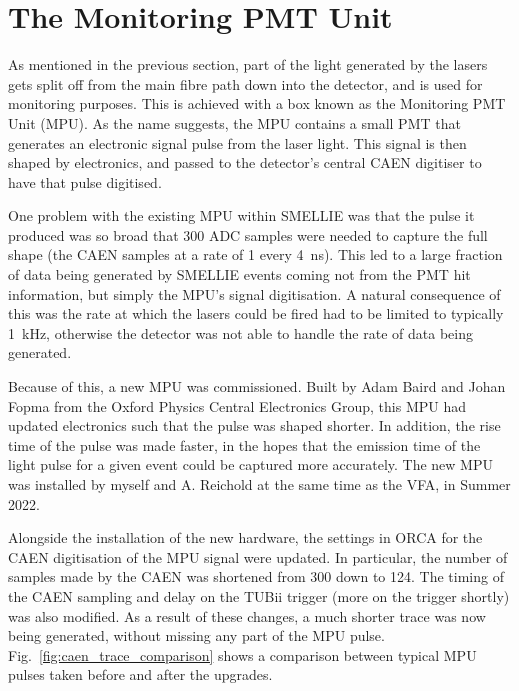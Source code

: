 \section{The Monitoring PMT Unit}\label{sec:smellie_mpu}
As mentioned in the previous section, part of the light generated by the lasers gets split off from the main fibre path down into the detector, and is used for monitoring purposes. This is achieved with a box known as the Monitoring PMT Unit (MPU). As the name suggests, the MPU contains a small PMT that generates an electronic signal pulse from the laser light. This signal is then shaped by electronics, and passed to the detector's central CAEN digitiser to have that pulse digitised.

One problem with the existing MPU within SMELLIE was that the pulse it produced was so broad that 300 ADC samples were needed to capture the full shape (the CAEN samples at a rate of 1 every \SI{4}{\ns}). This led to a large fraction of data being generated by SMELLIE events coming not from the PMT hit information, but simply the MPU's signal digitisation. A natural consequence of this was the rate at which the lasers could be fired had to be limited to typically \SI{1}{\kHz}, otherwise the detector was not able to handle the rate of data being generated.

Because of this, a new MPU was commissioned. Built by Adam Baird and Johan Fopma from the Oxford Physics Central Electronics Group, this MPU had updated electronics such that the pulse was shaped shorter. In addition, the rise time of the pulse was made faster, in the hopes that the emission time of the light pulse for a given event could be captured more accurately. The new MPU was installed by myself and A. Reichold at the same time as the VFA, in Summer 2022.

Alongside the installation of the new hardware, the settings in ORCA for the CAEN digitisation of the MPU signal were updated. In particular, the number of samples made by the CAEN was shortened from 300 down to 124. The timing of the CAEN sampling and delay on the TUBii trigger (more on the trigger shortly) was also modified. As a result of these changes, a much shorter trace was now being generated, without missing any part of the MPU pulse. Fig.~\ref{fig:caen_trace_comparison} shows a comparison between typical MPU pulses taken before and after the upgrades.

